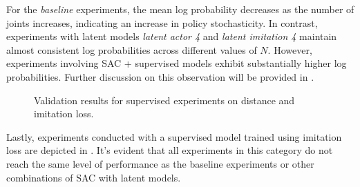 For the \textit{baseline} experiments, the mean log probability decreases as the number of joints increases, indicating an increase in policy stochasticity. In contrast, experiments with latent models \textit{latent actor 4} and  \textit{latent imitation 4} maintain almost consistent log probabilities across different values of $N$. However, experiments involving SAC + supervised models exhibit substantially higher log probabilities. Further discussion on this observation will be provided in .

\begin{figure}[h]
    \begin{center}
        \hfill
    \end{center}
    \caption[SAC + Supervised Distance and Imitation Loss]{Validation results for supervised experiments on distance and imitation loss. }
    \label{fig:sac_supervised_imitation}
\end{figure}

Lastly, experiments conducted with a supervised model trained using imitation loss are depicted in . It's evident that all experiments in this category do not reach the same level of performance as the baseline experiments or other combinations of SAC with latent models.